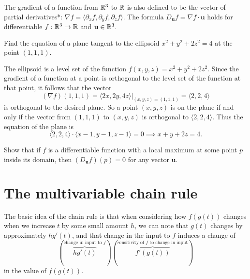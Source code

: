 \documentclass[svgnames]{report}
\begin{document}
The gradient of a function from $\mathbb{R}^3$ to $\mathbb{R}$ is also defined to
  be the vector of partial derivatives*: 
  $\nabla f = \langle \partial_x f, \partial_y f, \partial_z f
  \rangle$.  The formula
$D_{\mathbf{u}} f = \nabla f \cdot \mathbf{u}$ holds for
differentiable $f:\mathbb{R}^3 \to \mathbb{R}$ and $\mathbf{u} \in \mathbb{R}^3$. 

  \begin{example}{}{}
    Find the equation of a plane tangent to the ellipsoid $x^2 + y^2 +
    2z^2  = 4$ at the point $(1,1,1)$. 
  \end{example}

  \begin{solution}
    The ellipsoid is a level set of the function $f(x,y,z) = x^2 +
    y^2 + 2z^2$. Since the gradient of a function at a point is orthogonal to
    the level set of the function at that point, it follows that the
    vector 
    \[
      (\nabla f)(1,1,1) = \left.\langle 2x, 2y, 4z \rangle\right|_{(x,y,z) =
        (1,1,1)} = \langle 2, 2, 4 \rangle
    \]
    is orthogonal to the desired plane.  So a point $(x,y,z)$ is on the plane
    if and only if the vector from $(1,1,1)$ to $(x,y,z)$ is
    orthogonal to $\langle 2, 2, 4 \rangle$. Thus the equation of the
    plane is
    \[
      \langle 2, 2, 4 \rangle \cdot \langle x - 1, y - 1, z - 1
      \rangle = 0 \implies \boxed{x + y + 2z = 4}. 
    \]
  \end{solution}

  \begin{exercise}{}{}
    Show that if $f$ is a differentiable function with a local maximum
    at some point $p$ inside its domain, then $(D_{\mathbf{u}}f)(p) =
    0$ for any vector $\mathbf{u}$. 
  \end{exercise}

  \section{The multivariable chain rule}


  The basic idea of the chain rule is that when considering how
  $f(g(t))$ changes when we increase $t$ by some small amount $h$, we
  can note that $g(t)$ changes by approximately $hg'(t)$, and that
  change in the input to $f$ induces a change of
  \[
    \left(
      \overbrace{hg'(t)}^{\text{change in input to $f$}} 
    \right) \left( 
    \overbrace{f'(g(t))}^{\text{sensitivity of
        $f$ to change in input}}
    \right) 
  \]
  in the value of $f(g(t))$.
\end{document}
